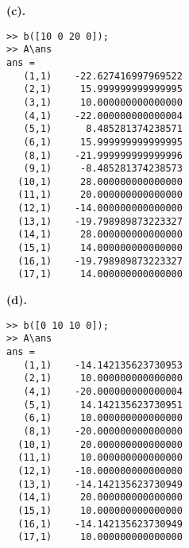 \textbf{(c).}
\begin{verbatim}
>> b([10 0 20 0]);
>> A\ans
ans =
   (1,1)    -22.627416997969522
   (2,1)     15.999999999999995
   (3,1)     10.000000000000000
   (4,1)    -22.000000000000004
   (5,1)      8.485281374238571
   (6,1)     15.999999999999995
   (8,1)    -21.999999999999996
   (9,1)     -8.485281374238573
  (10,1)     28.000000000000000
  (11,1)     20.000000000000000
  (12,1)    -14.000000000000000
  (13,1)    -19.798989873223327
  (14,1)     28.000000000000000
  (15,1)     14.000000000000000
  (16,1)    -19.798989873223327
  (17,1)     14.000000000000000
\end{verbatim}
\textbf{(d).}
\begin{verbatim}
>> b([0 10 10 0]);
>> A\ans
ans =
   (1,1)    -14.142135623730953
   (2,1)     10.000000000000000
   (4,1)    -20.000000000000004
   (5,1)     14.142135623730951
   (6,1)     10.000000000000000
   (8,1)    -20.000000000000000
  (10,1)     20.000000000000000
  (11,1)     10.000000000000000
  (12,1)    -10.000000000000000
  (13,1)    -14.142135623730949
  (14,1)     20.000000000000000
  (15,1)     10.000000000000000
  (16,1)    -14.142135623730949
  (17,1)     10.000000000000000
\end{verbatim}
\newpage
